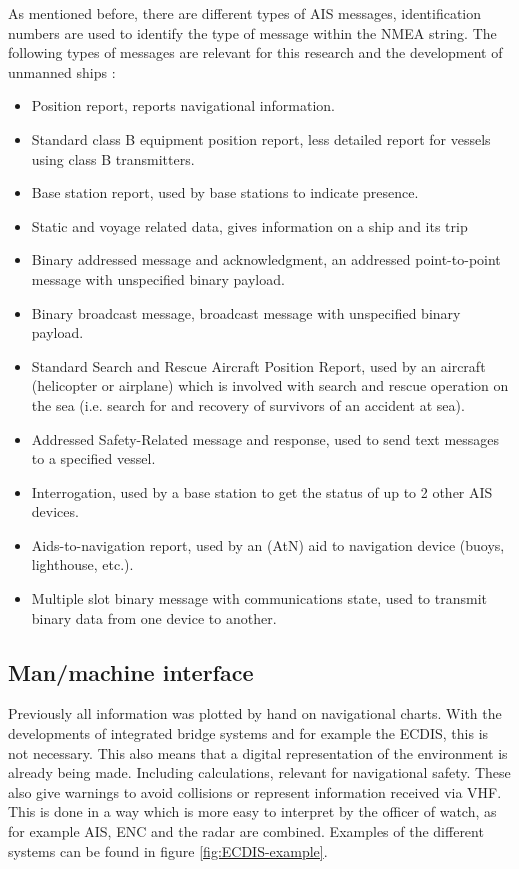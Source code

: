 As mentioned before, there are different types of \ac{AIS} messages, identification numbers are used to identify the type of message within the NMEA string. The following types of messages are relevant for this research and the development of unmanned ships \cite{USCG2018}:
\begin{itemize}
	\item Position report, reports navigational information.
	\item Standard class B equipment position report, less detailed report for vessels using class B transmitters.
	\item Base station report, used by base stations to indicate presence.
	\item Static and voyage related data, gives information on a ship and its trip
	\item Binary addressed message and acknowledgment, an addressed point-to-point message with unspecified binary payload.
	\item Binary broadcast message, broadcast message with unspecified binary payload.
	\item Standard Search and Rescue Aircraft Position Report, used by an aircraft (helicopter or airplane) which is involved with search and rescue operation on the sea (i.e. search for and recovery of survivors of an accident at sea).
	\item Addressed Safety-Related message and response, used to send text messages to a specified vessel.
	\item Interrogation, used by a base station to get the status of up to 2 other AIS devices.
	\item Aids-to-navigation report, used by an (AtN) aid to navigation device (buoys, lighthouse, etc.).
	\item Multiple slot binary message with communications state, used to transmit binary data from one device to another.
\end{itemize}

\subsection{Man/machine interface}
Previously all information was plotted by hand on navigational charts. With the developments of integrated bridge systems and for example the \ac{ECDIS}, this is not necessary. This also means that a digital representation of the environment is already being made. Including calculations, relevant for navigational safety. These also give warnings to avoid collisions or represent information received via \ac{VHF}. This is done in a way which is more easy to interpret by the officer of watch, as for example \ac{AIS}, \ac{ENC} and the radar are combined. Examples of the different systems can be found in figure \ref{fig:ECDIS-example}.

